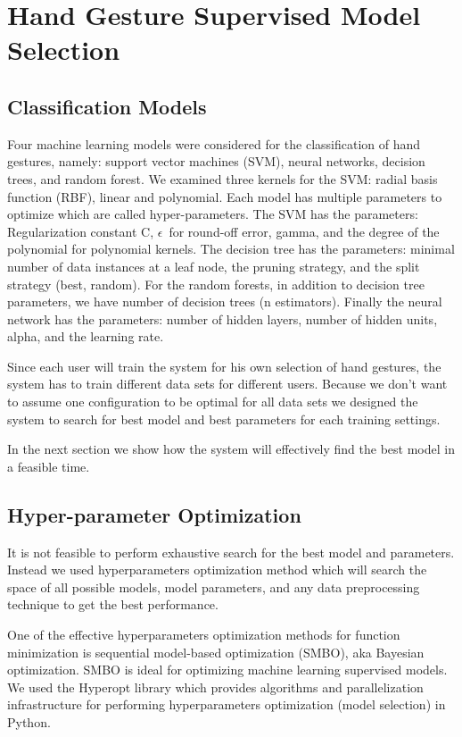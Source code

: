 \documentclass{article}
\begin{document}
\section{Hand Gesture Supervised Model Selection}

\subsection{Classification Models}

Four machine learning models were considered for the classification of hand gestures, namely: support vector machines (SVM), neural networks, decision trees, and random forest. We examined three kernels for the SVM: radial basis function (RBF), linear and polynomial.
Each model has multiple parameters to optimize which are called hyper-parameters. The SVM has the parameters: Regularization constant C, $\epsilon$\  for round-off error, gamma, and the degree of the polynomial for polynomial kernels. The decision tree has the parameters: minimal number of data instances at a leaf node, the pruning strategy, and the split strategy (best, random). For the random forests, in addition to decision tree parameters, we have number of decision trees (n estimators). Finally the neural network has the parameters:
number of hidden layers, number of hidden units, alpha, and the learning rate.

Since each user will train the system for his own selection of hand gestures, the system has to train different data sets for different users. Because we don't want to assume one configuration to be optimal for all data sets we designed the system to search for best model and best parameters for each training settings.

In the next section we show how the system will effectively find the best model in a feasible time.

\subsection{Hyper-parameter Optimization}
It is not feasible to perform exhaustive search for the best model and parameters. Instead we used hyperparameters optimization method which will search the space of all possible models, model parameters, and any data preprocessing technique to get the best performance.

One of the effective hyperparameters optimization methods for function minimization is sequential model-based optimization (SMBO), aka Bayesian optimization. SMBO is ideal for optimizing machine learning supervised models. We used the Hyperopt library \cite{bergstra2013hyperopt} which provides algorithms and parallelization infrastructure for performing hyperparameters optimization (model selection) in Python.\\
\end{document}

